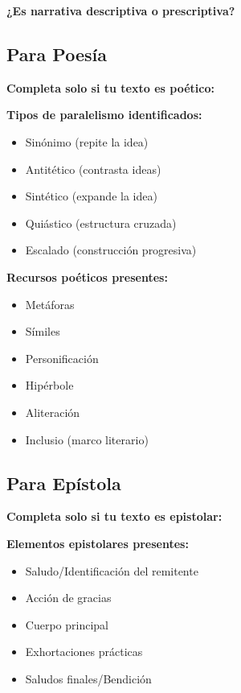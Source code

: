 \documentclass[11pt,a4paper]{article}
\begin{document}
\textbf{¿Es narrativa descriptiva o prescriptiva?}
\vspace{1.5cm}

\subsection{Para Poesía}

\begin{literarybox}
\textbf{Completa solo si tu texto es poético:}
\end{literarybox}

\textbf{Tipos de paralelismo identificados:}
\begin{itemize}[leftmargin=1cm]
    \item[$\square$] Sinónimo (repite la idea)
    \item[$\square$] Antitético (contrasta ideas)
    \item[$\square$] Sintético (expande la idea)
    \item[$\square$] Quiástico (estructura cruzada)
    \item[$\square$] Escalado (construcción progresiva)
\end{itemize}

\textbf{Recursos poéticos presentes:}
\begin{itemize}[leftmargin=1cm]
    \item[$\square$] Metáforas
    \item[$\square$] Símiles
    \item[$\square$] Personificación
    \item[$\square$] Hipérbole
    \item[$\square$] Aliteración
    \item[$\square$] Inclusio (marco literario)
\end{itemize}

\subsection{Para Epístola}

\begin{literarybox}
\textbf{Completa solo si tu texto es epistolar:}
\end{literarybox}

\textbf{Elementos epistolares presentes:}
\begin{itemize}[leftmargin=1cm]
    \item[$\square$] Saludo/Identificación del remitente
    \item[$\square$] Acción de gracias
    \item[$\square$] Cuerpo principal
    \item[$\square$] Exhortaciones prácticas
    \item[$\square$] Saludos finales/Bendición
\end{itemize}
\end{document}
